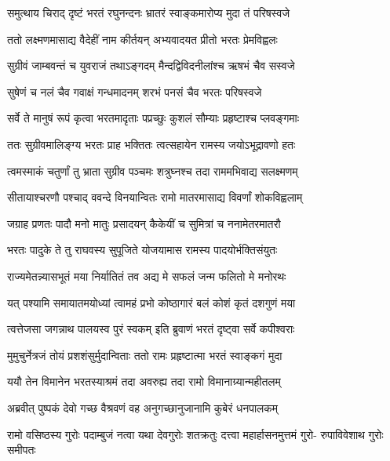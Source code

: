 \twolineshloka
{समुत्थाय चिराद् दृष्टं भरतं रघुनन्दनः}
{भ्रातरं स्वाङ्कमारोप्य मुदा तं परिषस्वजे} %

\twolineshloka
{ततो लक्ष्मणमासाद्य वैदेहीं नाम कीर्तयन्}
{अभ्यवादयत प्रीतो भरतः प्रेमविह्वलः} %

\twolineshloka
{सुग्रीवं जाम्बवन्तं च युवराजं तथाऽङ्गदम्}
{मैन्दद्विविदनीलांश्च ऋषभं चैव सस्वजे} %

\twolineshloka
{सुषेणं च नलं चैव गवाक्षं गन्धमादनम्}
{शरभं पनसं चैव भरतः परिषस्वजे} %

\twolineshloka
{सर्वे ते मानुषं रूपं कृत्वा भरतमादृताः}
{पप्रच्छुः कुशलं सौम्याः प्रहृष्टाश्च प्लवङ्गमाः} %

\twolineshloka
{ततः सुग्रीवमालिङ्ग्य भरतः प्राह भक्तितः}
{त्वत्सहायेन रामस्य जयोऽभूद्रावणो हतः} %

\twolineshloka
{त्वमस्माकं चतुर्णां तु भ्राता सुग्रीव पञ्चमः}
{शत्रुघ्नश्च तदा राममभिवाद्य सलक्ष्मणम्} %

\twolineshloka
{सीतायाश्चरणौ पश्चाद् ववन्दे विनयान्वितः}
{रामो मातरमासाद्य विवर्णां शोकविह्वलाम्} %

\twolineshloka
{जग्राह प्रणतः पादौ मनो मातुः प्रसादयन्}
{कैकेयीं च सुमित्रां च ननामेतरमातरौ} %

\twolineshloka
{भरतः पादुके ते तु राघवस्य सुपूजिते}
{योजयामास रामस्य पादयोर्भक्तिसंयुतः} %

\twolineshloka
{राज्यमेतन्न्यासभूतं मया निर्यातितं तव}
{अद्य मे सफलं जन्म फलितो मे मनोरथः} %

\twolineshloka
{यत् पश्यामि समायातमयोध्यां त्वामहं प्रभो}
{कोष्ठागारं बलं कोशं कृतं दशगुणं मया} %

\twolineshloka
{त्वत्तेजसा जगन्नाथ पालयस्व पुरं स्वकम्}
{इति ब्रुवाणं भरतं दृष्ट्वा सर्वे कपीश्वराः} %

\twolineshloka
{मुमुचुर्नेत्रजं तोयं प्रशशंसुर्मुदान्विताः}
{ततो रामः प्रहृष्टात्मा भरतं स्वाङ्कगं मुदा} %

\twolineshloka
{ययौ तेन विमानेन भरतस्याश्रमं तदा}
{अवरुह्य तदा रामो विमानाग्र्यान्महीतलम्} %

\twolineshloka
{अब्रवीत् पुष्पकं देवो गच्छ वैश्रवणं वह}
{अनुगच्छानुजानामि कुबेरं धनपालकम्} %

\fourlineindentedshloka
{रामो वसिष्ठस्य गुरोः पदाम्बुजं}
{नत्वा यथा देवगुरोः शतक्रतुः}
{दत्त्वा महार्हासनमुत्तमं गुरो-}
{रुपाविवेशाथ गुरोः समीपतः} %




